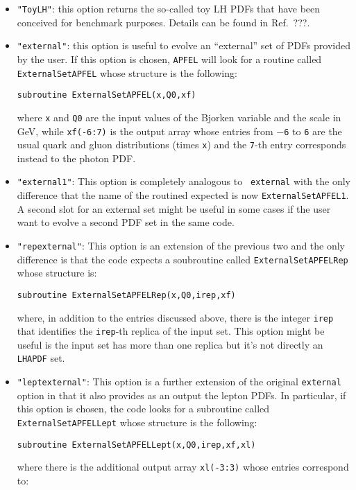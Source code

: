 \documentclass[11pt,a4paper]{article}
\begin{document}
\begin{itemize}
\item {\tt "ToyLH"}: this option returns the so-called toy LH PDFs
  that have been conceived for benchmark purposes. Details can be
  found in Ref.~???.
\item {\tt "external"}: this option is useful to evolve an
  ``external'' set of PDFs provided by the user. If this option is
  chosen, {\tt APFEL} will look for a routine called {\tt
    ExternalSetAPFEL} whose structure is the following:
\begin{center}
\tt subroutine ExternalSetAPFEL(x,Q0,xf)
\end{center}
 where {\tt x} and {\tt Q0} are the input values of the Bjorken
 variable and the scale in GeV, while {\tt xf(-6:7)} is the output
 array whose entries from {\tt $-$6} to {\tt 6} are the usual quark
 and gluon distributions (times {\tt x}) and the {\tt 7}-th entry
 corresponds instead to the photon PDF.
\item {\tt "external1"}: This option is completely analogous to {\tt
  external} with the only difference that the name of the routined
  expected is now {\tt ExternalSetAPFEL1}. A second slot for an
  external set might be useful in some cases if the user want to
  evolve a second PDF set in the same code.
\item {\tt "repexternal"}: This option is an extension of the previous
  two and the only difference is that the code expects a soubroutine
  called {\tt ExternalSetAPFELRep} whose structure is:
\begin{center}
\tt subroutine ExternalSetAPFELRep(x,Q0,irep,xf)
\end{center}
where, in addition to the entries discussed above, there is the
integer {\tt irep} that identifies the {\tt irep}-th replica of the
input set.  This option might be useful is the input set has more than
one replica but it's not directly an {\tt LHAPDF} set.
\item {\tt "leptexternal"}: This option is a further extension of the
  original {\tt external} option in that it also provides as an output
  the lepton PDFs. In particular, if this option is chosen, the code
  looks for a subroutine called {\tt ExternalSetAPFELLept} whose
  structure is the following:
\begin{center}
\tt subroutine ExternalSetAPFELLept(x,Q0,irep,xf,xl)
\end{center}
where there is the additional output array {\tt xl(-3:3)} whose
entries correspond to:
\begin{center}

\end{center}
\end{itemize}
\end{document}
